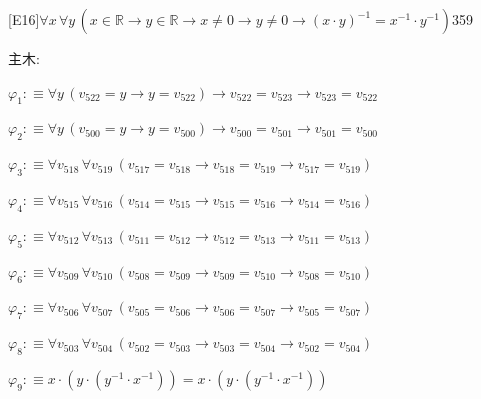 \begin{fullproof}{[E16]}{$\forall x\,\forall y\,(x \in \mathbb{R} \to y \in \mathbb{R} \to x \neq 0 \to y \neq 0 \to (x \cdot y)^{-1} = x^{-1} \cdot y^{-1})$}{359}
\begin{ptree}
\noLine
{}
\end{ptree}
\noindent 主木:
\begin{ptree}
\noLine
{}
\noLine
{}
\noLine
{}
\noLine
{}
\noLine
{}
\end{ptree}
\begin{abbrevlist}
\item $\varphi_{1} :\equiv \forall y\,(v_{522} = y \to y = v_{522}) \to v_{522} = v_{523} \to v_{523} = v_{522}$
\item $\varphi_{2} :\equiv \forall y\,(v_{500} = y \to y = v_{500}) \to v_{500} = v_{501} \to v_{501} = v_{500}$
\item $\varphi_{3} :\equiv \forall v_{518}\,\forall v_{519}\,(v_{517} = v_{518} \to v_{518} = v_{519} \to v_{517} = v_{519})$
\item $\varphi_{4} :\equiv \forall v_{515}\,\forall v_{516}\,(v_{514} = v_{515} \to v_{515} = v_{516} \to v_{514} = v_{516})$
\item $\varphi_{5} :\equiv \forall v_{512}\,\forall v_{513}\,(v_{511} = v_{512} \to v_{512} = v_{513} \to v_{511} = v_{513})$
\item $\varphi_{6} :\equiv \forall v_{509}\,\forall v_{510}\,(v_{508} = v_{509} \to v_{509} = v_{510} \to v_{508} = v_{510})$
\item $\varphi_{7} :\equiv \forall v_{506}\,\forall v_{507}\,(v_{505} = v_{506} \to v_{506} = v_{507} \to v_{505} = v_{507})$
\item $\varphi_{8} :\equiv \forall v_{503}\,\forall v_{504}\,(v_{502} = v_{503} \to v_{503} = v_{504} \to v_{502} = v_{504})$
\item $\varphi_{9} :\equiv x \cdot (y \cdot (y^{-1} \cdot x^{-1})) = x \cdot (y \cdot (y^{-1} \cdot x^{-1}))$

\end{abbrevlist}
\end{fullproof}
